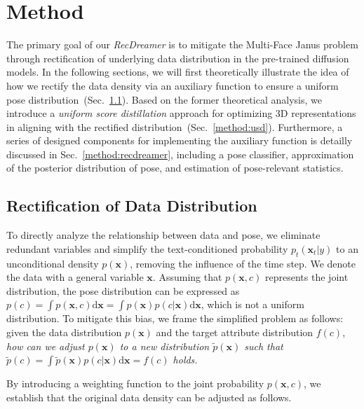 


\section{Method}


The primary goal of our \textit{RecDreamer} is to mitigate the Multi-Face Janus problem through rectification of underlying data distribution in the pre-trained diffusion models. In the following sections, we will first theoretically illustrate the idea of how we rectify the data density via an auxiliary function to ensure a uniform pose distribution~(Sec.~\ref{method:rec}). Based on the former theoretical analysis, we introduce a \textit{uniform score distillation} approach for optimizing 3D representations in aligning with the rectified distribution~(Sec.~\ref{method:usd}). Furthermore, a series of designed components for implementing the auxiliary function is detailly discussed in Sec.~\ref{method:recdreamer}, including a pose classifier, approximation of the posterior distribution of pose, and estimation of pose-relevant statistics.



\subsection{Rectification of Data Distribution}\label{method:rec}


To directly analyze the relationship between data and pose, we eliminate redundant variables and simplify the text-conditioned probability $p_t(\boldsymbol{x}_t|y)$ to an unconditional density $p(\boldsymbol{x})$, removing the influence of the time step.
We denote the data with a general variable $\boldsymbol{x}$.
Assuming that $p(\boldsymbol{x}, c)$ represents the joint distribution, the pose distribution can be expressed as $p(c) = \int p(\boldsymbol{x}, c) \mathrm{d}\boldsymbol{x} = \int p(\boldsymbol{x}) p(c|\boldsymbol{x}) \mathrm{d}\boldsymbol{x}$, which is not a uniform distribution.
To mitigate this bias, we frame the simplified problem as follows: given the data distribution $p(\boldsymbol{x})$ and the target attribute distribution $f(c)$, \textit{how can we adjust $p(\boldsymbol{x})$ to a new distribution $\tilde{p}(\boldsymbol{x})$ such that $\tilde{p}(c) = \int \tilde{p}(\boldsymbol{x}) p(c|\boldsymbol{x}) \mathrm{d}\boldsymbol{x}=f(c)$ holds.}


By introducing a weighting function to the joint probability $p(\boldsymbol{x}, c)$, we establish that the original data density can be adjusted as follows.

